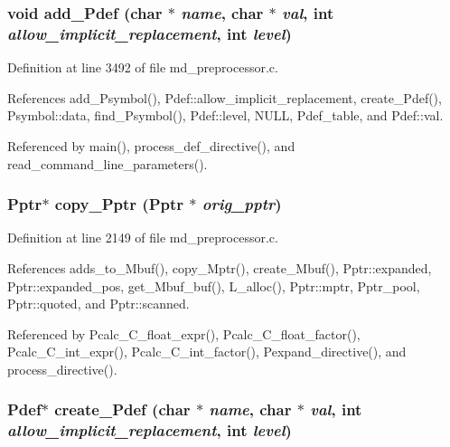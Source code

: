 \subsubsection{\setlength{\rightskip}{0pt plus 5cm}void add\_\-Pdef (char $\ast$ {\em name}, char $\ast$ {\em val}, int {\em allow\_\-implicit\_\-replacement}, int {\em level})}\label{md__preprocessor_8c_a664d54fd7aa40b97a202097ac127738}




Definition at line 3492 of file md\_\-preprocessor.c.

References add\_\-Psymbol(), Pdef::allow\_\-implicit\_\-replacement, create\_\-Pdef(), Psymbol::data, find\_\-Psymbol(), Pdef::level, NULL, Pdef\_\-table, and Pdef::val.

Referenced by main(), process\_\-def\_\-directive(), and read\_\-command\_\-line\_\-parameters().
\subsubsection{\setlength{\rightskip}{0pt plus 5cm}\bf{Pptr}$\ast$ copy\_\-Pptr (\bf{Pptr} $\ast$ {\em orig\_\-pptr})}\label{md__preprocessor_8c_f0da883268c1e42b311b6d8673f6206e}




Definition at line 2149 of file md\_\-preprocessor.c.

References adds\_\-to\_\-Mbuf(), copy\_\-Mptr(), create\_\-Mbuf(), Pptr::expanded, Pptr::expanded\_\-pos, get\_\-Mbuf\_\-buf(), L\_\-alloc(), Pptr::mptr, Pptr\_\-pool, Pptr::quoted, and Pptr::scanned.

Referenced by Pcalc\_\-C\_\-float\_\-expr(), Pcalc\_\-C\_\-float\_\-factor(), Pcalc\_\-C\_\-int\_\-expr(), Pcalc\_\-C\_\-int\_\-factor(), Pexpand\_\-directive(), and process\_\-directive().
\subsubsection{\setlength{\rightskip}{0pt plus 5cm}\bf{Pdef}$\ast$ create\_\-Pdef (char $\ast$ {\em name}, char $\ast$ {\em val}, int {\em allow\_\-implicit\_\-replacement}, int {\em level})}\label{md__preprocessor_8c_cf9d96a6259b42e99198e03a423214d7}




